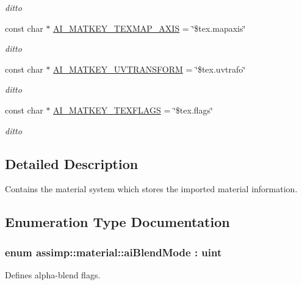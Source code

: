 \begin{DoxyCompactItemize}
\begin{DoxyCompactList}\small\item\em ditto \end{DoxyCompactList}\item 
\hypertarget{namespaceassimp_1_1material_adde1ce46d96b4edfd9a8f0d27a9b26f6}{const char $\ast$ \hyperlink{namespaceassimp_1_1material_adde1ce46d96b4edfd9a8f0d27a9b26f6}{A\+I\+\_\+\+M\+A\+T\+K\+E\+Y\+\_\+\+T\+E\+X\+M\+A\+P\+\_\+\+A\+X\+I\+S} = \char`\"{}\$tex.\+mapaxis\char`\"{}}\label{namespaceassimp_1_1material_adde1ce46d96b4edfd9a8f0d27a9b26f6}

\begin{DoxyCompactList}\small\item\em ditto \end{DoxyCompactList}\item 
\hypertarget{namespaceassimp_1_1material_ae89583f42aee11b7a5fbc9bd3f851664}{const char $\ast$ \hyperlink{namespaceassimp_1_1material_ae89583f42aee11b7a5fbc9bd3f851664}{A\+I\+\_\+\+M\+A\+T\+K\+E\+Y\+\_\+\+U\+V\+T\+R\+A\+N\+S\+F\+O\+R\+M} = \char`\"{}\$tex.\+uvtrafo\char`\"{}}\label{namespaceassimp_1_1material_ae89583f42aee11b7a5fbc9bd3f851664}

\begin{DoxyCompactList}\small\item\em ditto \end{DoxyCompactList}\item 
\hypertarget{namespaceassimp_1_1material_ae6d29c4b4bdbeacdc2631c72c0a4f08b}{const char $\ast$ \hyperlink{namespaceassimp_1_1material_ae6d29c4b4bdbeacdc2631c72c0a4f08b}{A\+I\+\_\+\+M\+A\+T\+K\+E\+Y\+\_\+\+T\+E\+X\+F\+L\+A\+G\+S} = \char`\"{}\$tex.\+flags\char`\"{}}\label{namespaceassimp_1_1material_ae6d29c4b4bdbeacdc2631c72c0a4f08b}

\begin{DoxyCompactList}\small\item\em ditto \end{DoxyCompactList}\end{DoxyCompactItemize}


\subsection{Detailed Description}
Contains the material system which stores the imported material information. 

\subsection{Enumeration Type Documentation}
\hypertarget{namespaceassimp_1_1material_a9f8c96d3f766b60d6a002a839366b1eb}{
\subsubsection[{ai\+Blend\+Mode}]{\setlength{\rightskip}{0pt plus 5cm}enum {\bf assimp\+::material\+::ai\+Blend\+Mode} \+: uint}}\label{namespaceassimp_1_1material_a9f8c96d3f766b60d6a002a839366b1eb}
Defines alpha-\/blend flags.

